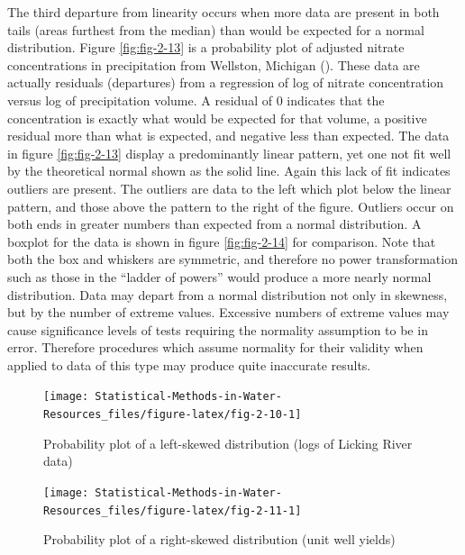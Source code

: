 \documentclass[]{book}
\begin{document}
The third departure from linearity occurs when more data are present in both tails (areas furthest from the median) than would be expected for a normal distribution. Figure \ref{fig:fig-2-13} is a probability plot of adjusted nitrate concentrations in precipitation from Wellston, Michigan (\citet{schertz_trend_1985}). These data are actually residuals (departures) from a regression of log of nitrate concentration versus log of precipitation volume. A residual of 0 indicates that the concentration is exactly what would be expected for that volume, a positive residual more than what is expected, and negative less than expected. The data in figure \ref{fig:fig-2-13} display a predominantly linear pattern, yet one not fit well by the theoretical normal shown as the solid line. Again this lack of fit indicates outliers are present. The outliers are data to the left which plot below the linear pattern, and those above the pattern to the right of the figure. Outliers occur on both ends in greater numbers than expected from a normal distribution. A boxplot for the data is shown in figure \ref{fig:fig-2-14} for comparison. Note that both the box and whiskers are symmetric, and therefore no power transformation such as those in the ``ladder of powers'' would produce a more nearly normal distribution. Data may depart from a normal distribution not only in skewness, but by the number of extreme values. Excessive numbers of extreme values may cause significance levels of tests requiring the normality assumption to be in error. Therefore procedures which assume normality for their validity when applied to data of this type may produce quite inaccurate results.

\begin{figure}

{\centering \texttt{[image: Statistical-Methods-in-Water-Resources\_files/figure-latex/fig-2-10-1]} 

}

\caption{Probability plot of a left-skewed distribution (logs of Licking River data)}\label{fig:fig-2-10}
\end{figure}
\begin{figure}

{\centering \texttt{[image: Statistical-Methods-in-Water-Resources\_files/figure-latex/fig-2-11-1]} 

}

\caption{Probability plot of a right-skewed distribution (unit well yields)}\label{fig:fig-2-11}
\end{figure}
\end{document}
